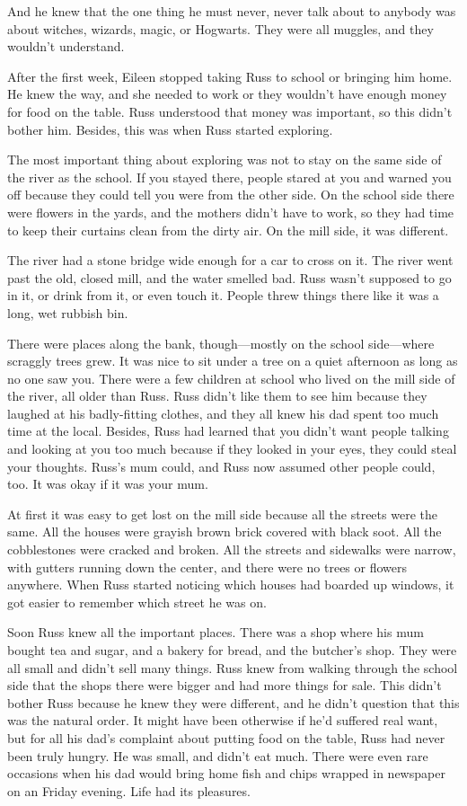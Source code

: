 And he knew that the one thing he must never, never talk about to anybody was about witches, wizards, magic, or Hogwarts. They were all muggles, and they wouldn't understand.

After the first week, Eileen stopped taking Russ to school or bringing him home. He knew the way, and she needed to work or they wouldn't have enough money for food on the table. Russ understood that money was important, so this didn't bother him. Besides, this was when Russ started exploring.

The most important thing about exploring was not to stay on the same side of the river as the school. If you stayed there, people stared at you and warned you off because they could tell you were from the other side. On the school side there were flowers in the yards, and the mothers didn't have to work, so they had time to keep their curtains clean from the dirty air. On the mill side, it was different.

The river had a stone bridge wide enough for a car to cross on it. The river went past the old, closed mill, and the water smelled bad. Russ wasn't supposed to go in it, or drink from it, or even touch it. People threw things there like it was a long, wet rubbish bin.

There were places along the bank, though—mostly on the school side—where scraggly trees grew. It was nice to sit under a tree on a quiet afternoon as long as no one saw you. There were a few children at school who lived on the mill side of the river, all older than Russ. Russ didn't like them to see him because they laughed at his badly-fitting clothes, and they all knew his dad spent too much time at the local. Besides, Russ had learned that you didn't want people talking and looking at you too much because if they looked in your eyes, they could steal your thoughts. Russ's mum could, and Russ now assumed other people could, too. It was okay if it was your mum.

At first it was easy to get lost on the mill side because all the streets were the same. All the houses were grayish brown brick covered with black soot. All the cobblestones were cracked and broken. All the streets and sidewalks were narrow, with gutters running down the center, and there were no trees or flowers anywhere. When Russ started noticing which houses had boarded up windows, it got easier to remember which street he was on.

Soon Russ knew all the important places. There was a shop where his mum bought tea and sugar, and a bakery for bread, and the butcher's shop. They were all small and didn't sell many things. Russ knew from walking through the school side that the shops there were bigger and had more things for sale. This didn't bother Russ because he knew they were different, and he didn't question that this was the natural order. It might have been otherwise if he'd suffered real want, but for all his dad's complaint about putting food on the table, Russ had never been truly hungry. He was small, and didn't eat much. There were even rare occasions when his dad would bring home fish and chips wrapped in newspaper on an Friday evening. Life had its pleasures.

